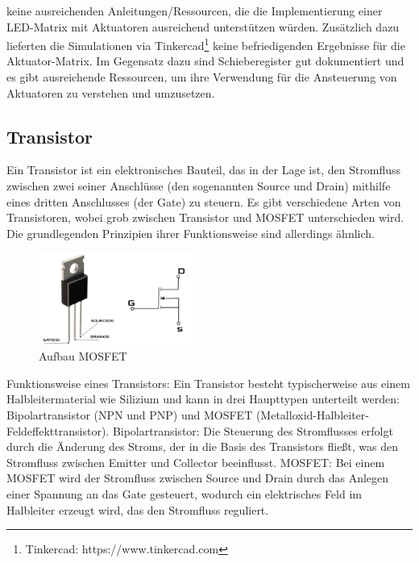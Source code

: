 \begin{enumerate}
	keine ausreichenden Anleitungen/Ressourcen, die die Implementierung einer LED-Matrix mit Aktuatoren ausreichend
	unterstützen würden. Zusätzlich dazu lieferten die Simulationen via Tinkercad\footnote{Tinkercad: https://www.tinkercad.com} keine befriedigenden Ergebnisse
	für die Aktuator-Matrix.
	Im Gegensatz dazu sind Schieberegister gut dokumentiert und es gibt ausreichende Ressourcen, um ihre
	Verwendung für die Ansteuerung von Aktuatoren zu verstehen und umzusetzen.
\end{enumerate}

\subsection{Transistor} %
Ein Transistor ist ein elektronisches Bauteil, das in der Lage ist, den Stromfluss zwischen zwei seiner Anschlüsse
(den sogenannten Source und Drain) mithilfe eines dritten Anschlusses (der Gate) zu steuern. Es gibt verschiedene Arten
von Transistoren, wobei grob zwischen Transistor und MOSFET unterschieden wird.
Die grundlegenden Prinzipien ihrer Funktionsweise sind allerdings ähnlich.

\begin{figure}[htbp] %
	\centering
	\includegraphics[width=0.45\textwidth]{img/Mosfet}
	\caption{Aufbau MOSFET}
	\label{img:transistor}
\end{figure}

Funktionsweise eines Transistors:
Ein Transistor besteht typischerweise aus einem Halbleitermaterial wie Silizium und kann in drei Haupttypen unterteilt
werden: Bipolartransistor (NPN und PNP) und MOSFET (Metalloxid-Halbleiter-Feldeffekttransistor).  \newline
Bipolartransistor: Die Steuerung des Stromflusses erfolgt durch die Änderung des Stroms, der in die Basis des
Transistors fließt, was den Stromfluss zwischen Emitter und Collector beeinflusst. \newline
MOSFET: Bei einem MOSFET wird der Stromfluss zwischen Source und Drain durch das Anlegen einer Spannung an das Gate
gesteuert, wodurch ein elektrisches Feld im Halbleiter erzeugt wird, das den Stromfluss reguliert. \newline

